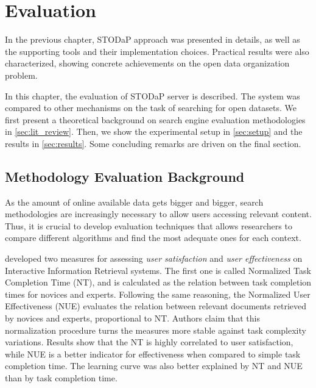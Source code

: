 \chapter{Evaluation}

In the previous chapter, STODaP approach was presented in details, as well as the supporting tools and their implementation choices.
Practical results were also characterized, showing concrete achievements on the open data organization problem.

In this chapter, the evaluation of STODaP server is described.
The system was compared to other mechanisms on the task of searching for open datasets.
We first present a theoretical background on search engine evaluation methodologies in \autoref{sec:lit_review}.
Then, we show the experimental setup in \autoref{sec:setup} and the results in \autoref{sec:results}.
Some concluding remarks are driven on the final section.

\section{Methodology Evaluation Background}
\label{sec:lit_review}

As the amount of online available data gets bigger and bigger, search methodologies are increasingly necessary to allow users accessing relevant content.
Thus, it is crucial to develop evaluation techniques that allows researchers to compare different algorithms and find the most adequate ones for each context.

 developed two measures for assessing \emph{user satisfaction} and \emph{user effectiveness} on Interactive Information Retrieval systems.
The first one is called Normalized Task Completion Time (NT), and is calculated as the relation between task completion times for novices and experts.
Following the same reasoning, the Normalized User Effectiveness (NUE) evaluates the relation between relevant documents retrieved by novices and experts, proportional to NT.
Authors claim that this normalization procedure turns the measures more stable against task complexity variations.
Results show that the NT is highly correlated to user satisfaction, while NUE is a better indicator for effectiveness when compared to simple task completion time.
The learning curve was also better explained by NT and NUE than by task completion time.

